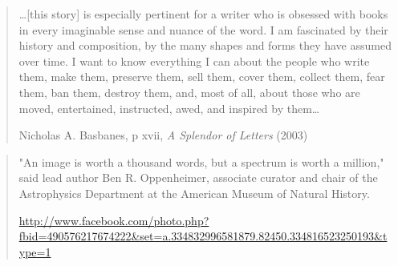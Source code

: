 \usepackage{books20}



\mainmatter

\begin{quote}

\ldots [this story] is especially pertinent for a writer who is
obsessed with books in every imaginable sense and nuance of the
word. I am fascinated by their history and composition, by the many
shapes and forms they have assumed over time. I want to know
everything I can about the people who write them, make them, preserve
them, sell them, cover them, collect them, fear them, ban them,
destroy them, and, most of all, about those who are moved,
entertained, instructed, awed, and inspired by them\ldots

         Nicholas A. Basbanes, p xvii, {\it A Splendor of Letters} (2003)\cite{basbanes:2003}
\end{quote}


\begin{quote}

"An image is worth a thousand words, but a spectrum is worth a
million," said lead author Ben R. Oppenheimer, associate curator and
chair of the Astrophysics Department at the American Museum of
Natural History.

 \url{http://www.facebook.com/photo.php?fbid=490576217674222&set=a.334832996581879.82450.334816523250193&type=1}
\end{quote}

\backmatter





